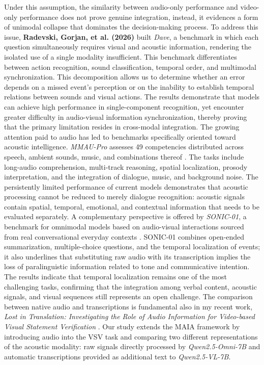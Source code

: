 Under this assumption, the similarity between audio-only performance and video-only performance does not prove genuine integration, instead, it evidences a form of unimodal collapse that dominates the decision-making process.
To address this issue, \textbf{Radevski, Gorjan, et al. (2026)} built \textit{Dave}\cite{radevski2026dave}, a benchmark in which each question simultaneously requires visual and acoustic information, rendering the isolated use of a single modality insufficient. This benchmark differentiates between action recognition, sound classification, temporal order, and multimodal synchronization. This decomposition allows us to determine whether an error depends on a missed event's perception or on the inability to establish temporal relations between sounds and visual actions. The results demonstrate that models can achieve high performance in single-component recognition, yet encounter greater difficulty in audio-visual information synchronization, thereby proving that the primary limitation resides in cross-modal integration.
The growing attention paid to audio has led to benchmarks specifically oriented toward acoustic intelligence. \textit{MMAU-Pro} assesses 49 competencies distributed across speech, ambient sounds, music, and combinations thereof \cite{kumar2026mmaupro}. The tasks include long-audio comprehension, multi-track reasoning, spatial localization, prosody interpretation, and the integration of dialogue, music, and background noise. The persistently limited performance of current models demonstrates that acoustic processing cannot be reduced to merely dialogue recognition: acoustic signals contain spatial, temporal, emotional, and contextual information that needs to be evaluated separately.
A complementary perspective is offered by \textit{SONIC-01}, a benchmark for omnimodal models based on audio-visual interactions sourced from real conversational everyday contexts \cite{radwan2026sonic}. SONIC-01 combines open-ended summarization, multiple-choice questions, and the temporal localization of events; it also underlines that substituting raw audio with its transcription implies the loss of paralinguistic information related to tone and communicative intention. The results indicate that temporal localization remains one of the most challenging tasks, confirming that the integration among verbal content, acoustic signals, and visual sequences still represents an open challenge.
The comparison between native audio and transcriptions is fundamental also in my recent work, \textit{Lost in Translation: Investigating the Role of Audio Information for Video-based Visual Statement Verification} \cite{deodati2026lost}. Our study extends the MAIA framework by introducing audio into the VSV task and comparing two different representations of the acoustic modality: raw signals directly processed by \textit{Qwen2.5-Omni-7B} and automatic transcriptions provided as additional text to \textit{Qwen2.5-VL-7B}.
